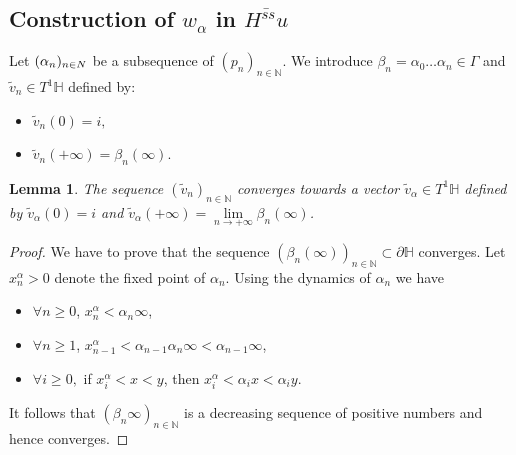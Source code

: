\documentclass[a4paper,english,reqno]{amsart}
\renewcommand{\H}{\mathbb{H}}
\newcommand{\N}{\mathbb{N}} %
\newtheorem{lemma}{Lemma}
\theoremstyle{definition}
\numberwithin{equation}{section}
\begin{document}
 
 
\subsection{Construction of $w_\alpha$ in $\overline{H^{ss} u }$}


\par 	
	Let $(\alpha_n)_{n\in\\N}$ be a subsequence of $(p_n)_{n\in \N}.$ We introduce $\beta_n=\alpha_0\ldots\alpha_n\in\Gamma$ and $\tilde v_n\in T^1\H$ defined by:
	\begin{itemize}
		\item $\tilde v_n(0)=i,$
		\item $\tilde v_n(+\infty)=\beta_n(\infty)$.
	\end{itemize}

\begin{lemma}\label{lemma_vectors}
	The sequence $(\tilde v_n)_{n\in\N}$ converges towards a vector $\tilde v_\alpha\in T^1 \H $ defined by $\tilde v_\alpha (0)=i$ and $\tilde v_\alpha(+\infty)=\lim\limits_{n\to +\infty}\beta_n(\infty)$.
	
\end{lemma}


\begin{proof}
	We have to prove that the sequence $(\beta_n(\infty))_{n\in\N}\subset \partial \H$ converges. Let $x_n^{\alpha}>0$ denote the fixed point of $\alpha_n$. 
	Using the dynamics of $\alpha_n$ we have
	\begin{itemize}
		\item $\forall n\geq 0$, $x_n^{\alpha} < \alpha_n\infty$,
		\item $\forall n\geq 1$, $x_{n-1}^{\alpha}<\alpha_{n-1}\alpha_n\infty<\alpha_{n-1}\infty$,
		\item $\forall i\geq 0,$ if $x_i^{\alpha}<x<y$, then $x_i^{\alpha}<\alpha_i x<\alpha_iy.$
	\end{itemize}
	It follows that $(\beta_n \infty )_{n\in\N}$ is a decreasing sequence of positive numbers and hence converges.

 \end{proof}
\end{document}
